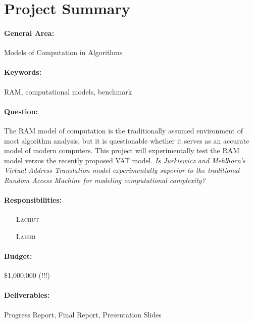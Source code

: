 \maketitle

\section{Project Summary}

\paragraph{General Area:} Models of Computation in Algorithms

\paragraph{Keywords:} RAM, computational models, benchmark

\paragraph{Question:} The RAM model of computation is the traditionally
assumed environment of most algorithm analysis, but it is questionable whether
it serves as an accurate model of modern computers. This project will
experimentally test the RAM model versus the recently proposed VAT model.
{\em Is Jurkiewicz and Mehlhorn's Virtual Address Translation model
experimentally superior to the traditional Random Access Machine for modeling
computational complexity?}

\paragraph{Responsibilities:}
  \begin{itemize}
    \item[\textsc{Lachut}] 
    \item[\textsc{Lahiri}] 
  \end{itemize}

\paragraph{Budget:} \$1,000,000 (!!!)

\paragraph{Deliverables:} Progress Report, Final Report, Presentation Slides